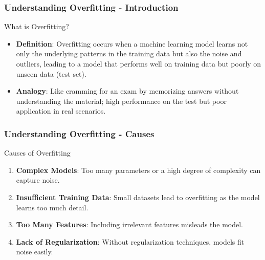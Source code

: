 \documentclass[aspectratio=169]{beamer}
\begin{document}
\begin{frame}[fragile]
    \frametitle{Understanding Overfitting - Introduction}
    \begin{block}{What is Overfitting?}
        \begin{itemize}
            \item \textbf{Definition}: Overfitting occurs when a machine learning model learns not only the underlying patterns in the training data but also the noise and outliers, leading to a model that performs well on training data but poorly on unseen data (test set).
            \item \textbf{Analogy}: Like cramming for an exam by memorizing answers without understanding the material; high performance on the test but poor application in real scenarios.
        \end{itemize}
    \end{block}
\end{frame}

\begin{frame}[fragile]
    \frametitle{Understanding Overfitting - Causes}
    \begin{block}{Causes of Overfitting}
        \begin{enumerate}
            \item \textbf{Complex Models}: Too many parameters or a high degree of complexity can capture noise.
            \item \textbf{Insufficient Training Data}: Small datasets lead to overfitting as the model learns too much detail.
            \item \textbf{Too Many Features}: Including irrelevant features misleads the model.
            \item \textbf{Lack of Regularization}: Without regularization techniques, models fit noise easily.
        \end{enumerate}
    \end{block}
\end{frame}
\end{document}
